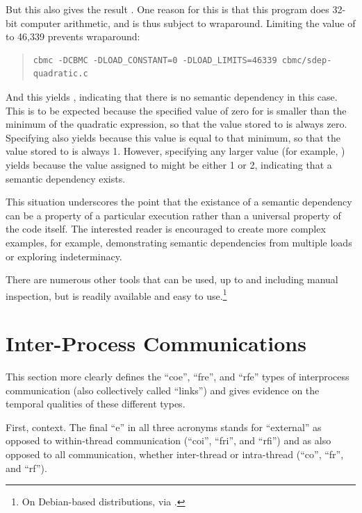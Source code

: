 \documentclass[10]{article}
\begin{document}
But this also gives the result .
One reason for this is that this program does 32-bit computer arithmetic,
and is thus subject to wraparound.
Limiting the value of  to 46,339 prevents wraparound:

\begin{quote}
\scriptsize
\begin{verbatim}
cbmc -DCBMC -DLOAD_CONSTANT=0 -DLOAD_LIMITS=46339 cbmc/sdep-quadratic.c
\end{verbatim}
\end{quote}

And this yields , indicating that there
is no semantic dependency in this case.
This is to be expected because the specified value of zero for 
is smaller than the minimum of the quadratic expression, so that the
value stored to  is always zero.
Specifying  also yields 
because this value is equal to that minimum, so that the value stored to
 is always 1.
However, specifying any larger value (for example, )
yields  because the value assigned to 
might be either 1 or 2, indicating that a semantic dependency exists.

This situation underscores the point that the existance of a semantic
dependency can be a property of a particular execution rather than a
universal property of the code itself.
The interested reader is encouraged to create more complex examples,
for example, demonstrating semantic dependencies from multiple loads or
exploring indeterminacy.

There are numerous other tools that can be used, up to and including
manual inspection, but  is readily available and easy to
use.\footnote{
	On Debian-based distributions, via .}

\clearpage

\section{Inter-Process Communications}
\label{app:Inter-Process Communications}

This section more clearly defines the ``coe'', ``fre'', and ``rfe''
types of interprocess communication (also collectively called ``links'')
and gives evidence on the temporal qualities of these different types.

First, context.
The final ``e'' in all three acronyms stands for ``external'' as opposed
to within-thread communication (``coi'', ``fri'', and ``rfi'') and as
also opposed to all communication, whether inter-thread or intra-thread
(``co'', ``fr'', and ``rf'').
\end{document}
